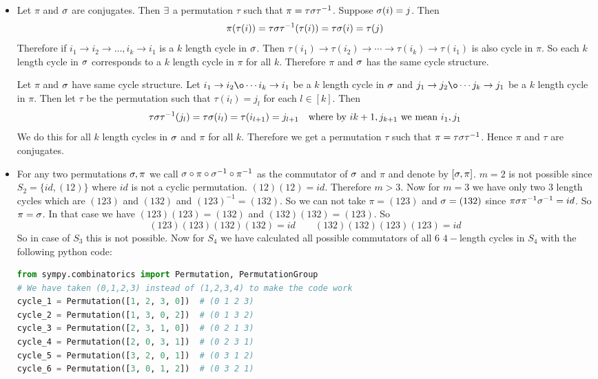 \documentclass[a4paper, 11pt]{article}
\begin{document}
\begin{itemize}
	\item Let $\pi$ and $\sigma$ are conjugates. Then $\exists$ a permutation $\tau$ such that $\pi=\tau\sigma\tau^{-1}$. Suppose $\sigma(i)=j$. Then $$\pi(\tau(i))=\tau\sigma\tau^{-1}(\tau(i))=\tau\sigma(i)=\tau(j)$$Therefore if $i_1\to i_2\to \dots, i_k\to i_1$ is a $k$ length cycle in $\sigma$. Then $\tau(i_1)\to \tau(i_2)\to \cdots\to \tau(i_k)\to \tau(i_1)$ is also cycle in $\pi$. So each $k$ length cycle in $\sigma$ corresponds to a $k$ length cycle in $\pi$ for all $k$. Therefore $\pi$ and $\sigma$ has the same cycle structure.
	\parinn
	
	Let $\pi$ and $\sigma$ have same cycle structure. Let $i_1\to i_2\o\cdots i_k\to i_1$  be a $k$ length cycle in $\sigma$ and $j_1\to j_2\o\cdots j_k\to j_1$ be a $k$ length cycle in $\pi$. Then let $\tau $ be the permutation such that $\tau(i_l)=j_l$ for each $l\in[k]$. Then $$\tau\sigma\tau^{-1}(j_l)=\tau\sigma(i_l)=\tau(i_{l+1})=j_{l+1}\quad\text{where by $i{k+1}, j_{k+1}$ we mean $i_1,j_1$}$$We do this for all $k$ length cycles in $\sigma$ and $\pi$ for all $k$. Therefore we get a permutation $\tau $ such that $\pi=\tau\sigma\tau^{-1}$. Hence $\pi$ and $\tau $ are conjugates.
	\item For any two permutations $\sigma,\pi$ we call $\sigma\circ\pi\circ \sigma^{-1}\circ\pi^{-1}$ as the commutator of $\sigma$ and $\pi$ and denote by $[\sigma,\pi]$. $m=2$ is not possible since $S_2=\{id, (12)\}$ where $id$ is not a cyclic permutation. $(12)(12)=id$. Therefore $m>3$. Now for $m=3$ we have only two 3 length cycles which are $(123)$ and $(132)$ and $(123)^{-1}=(132)$. So we can not take $\pi=(123)$ and $\sigma=(132)$ since $\pi\sigma\pi^{-1}\sigma^{-1}=id$. So $\pi=\sigma$. In that case we have $(123)(123)=(132)$ and $(132)(132)=(123)$. So $$(123)(123)(132)(132)=id\qquad (132)(132)(123)(123)=id$$So in case of $S_3$ this is not possible. Now for $S_4$ we have calculated all possible commutators of all 6 $4-$length cycles in $S_4$ with the following python code:


\begin{lstlisting}[language=Python]
from sympy.combinatorics import Permutation, PermutationGroup
# We have taken (0,1,2,3) instead of (1,2,3,4) to make the code work
cycle_1 = Permutation([1, 2, 3, 0])  # (0 1 2 3)
cycle_2 = Permutation([1, 3, 0, 2])  # (0 1 3 2)
cycle_3 = Permutation([2, 3, 1, 0])  # (0 2 1 3)
cycle_4 = Permutation([2, 0, 3, 1])  # (0 2 3 1)
cycle_5 = Permutation([3, 2, 0, 1])  # (0 3 1 2)
cycle_6 = Permutation([3, 0, 1, 2])  # (0 3 2 1)
	

\end{lstlisting}
\end{itemize}
\end{document}
